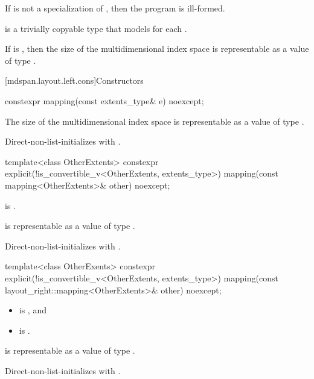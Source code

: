 \pnum
If  is not a specialization of ,
then the program is ill-formed.

\pnum
{} is a trivially copyable type
that models  for each .

\pnum
\mandates
If  is ,
then the size of the multidimensional index space 
is representable as a value of type .

[mdspan.layout.left.cons]{Constructors}

%
\begin{itemdecl}
constexpr mapping(const extents_type& e) noexcept;
\end{itemdecl}

\begin{itemdescr}
\pnum
\expects
The size of the multidimensional index space 
is representable as a value of type .

\pnum
\effects
Direct-non-list-initializes  with .
\end{itemdescr}

%
\begin{itemdecl}
template<class OtherExtents>
  constexpr explicit(!is_convertible_v<OtherExtents, extents_type>)
    mapping(const mapping<OtherExtents>& other) noexcept;
\end{itemdecl}

\begin{itemdescr}
\pnum
\constraints
{} is .

\pnum
\expects
{} is representable as
a value of type .

\pnum
\effects
Direct-non-list-initializes  with .
\end{itemdescr}

%
\begin{itemdecl}
template<class OtherExents>
  constexpr explicit(!is_convertible_v<OtherExtents, extents_type>)
    mapping(const layout_right::mapping<OtherExtents>& other) noexcept;
\end{itemdecl}

\begin{itemdescr}
\pnum
\constraints
\begin{itemize}
\item
{} is , and
\item
{} is .
\end{itemize}

\pnum
\expects
{} is representable as
a value of type .

\pnum
\effects
Direct-non-list-initializes  with .
\end{itemdescr}

